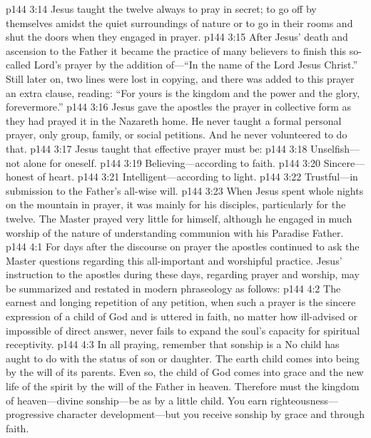 \vs p144 3:14 Jesus taught the twelve always to pray in secret; to go off by themselves amidst the quiet surroundings of nature or to go in their rooms and shut the doors when they engaged in prayer.
\vs p144 3:15 After Jesus’ death and ascension to the Father it became the practice of many believers to finish this so\hyp{}called Lord’s prayer by the addition of---“In the name of the Lord Jesus Christ.” Still later on, two lines were lost in copying, and there was added to this prayer an extra clause, reading: “For yours is the kingdom and the power and the glory, forevermore.”
\vs p144 3:16 Jesus gave the apostles the prayer in collective form as they had prayed it in the Nazareth home. He never taught a formal personal prayer, only group, family, or social petitions. And he never volunteered to do that.\plusone
\vs p144 3:17 Jesus taught that effective prayer must be:
\pc \vs p144 3:18 \bibnobreakspace Unselfish---not alone for oneself.
\vs p144 3:19 \bibnobreakspace Believing---according to faith.
\vs p144 3:20 \bibnobreakspace Sincere---honest of heart.
\vs p144 3:21 \bibnobreakspace Intelligent---according to light.
\vs p144 3:22 \bibnobreakspace Trustful---in submission to the Father’s all\hyp{}wise will.
\pc \vs p144 3:23 When Jesus spent whole nights on the mountain in prayer, it was mainly for his disciples, particularly for the twelve. The Master prayed very little for himself, although he engaged in much worship of the nature of understanding communion with his Paradise Father.
\vs p144 4:1 For days after the discourse on prayer the apostles continued to ask the Master questions regarding this all\hyp{}important and worshipful practice. Jesus’ instruction to the apostles during these days, regarding prayer and worship, may be summarized and restated in modern phraseology as follows:
\pc \vs p144 4:2 The earnest and longing repetition of any petition, when such a prayer is the sincere expression of a child of God and is uttered in faith, no matter how ill\hyp{}advised or impossible of direct answer, never fails to expand the soul’s capacity for spiritual receptivity.
\vs p144 4:3 In all praying, remember that sonship is a  No child has aught to do with  the status of son or daughter. The earth child comes into being by the will of its parents. Even so, the child of God comes into grace and the new life of the spirit by the will of the Father in heaven. Therefore must the kingdom of heaven---divine sonship---be  as by a little child. You earn righteousness---progressive character development---but you receive sonship by grace and through faith.
